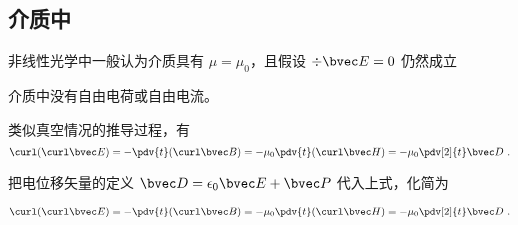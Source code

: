 \subsection{介质中}

非线性光学中一般认为介质具有 $\mu = \mu_0$，且假设 $\div\bvec E = 0$ 仍然成立

介质中没有自由电荷或自由电流。

类似真空情况的推导过程，有
\begin{equation}
\curl(\curl\bvec E) = -\pdv{t} (\curl\bvec B) = -\mu_0 \pdv{t} (\curl\bvec H)
= -\mu_0 \pdv[2]{t} \bvec D~.
\end{equation}

把电位移矢量的定义 $\bvec D = \epsilon_0\bvec E + \bvec P$ 代入上式，化简为

\begin{equation}
\curl(\curl\bvec E) = -\pdv{t} (\curl\bvec B) = -\mu_0 \pdv{t} (\curl\bvec H)
= -\mu_0 \pdv[2]{t} \bvec D~.
\end{equation}

